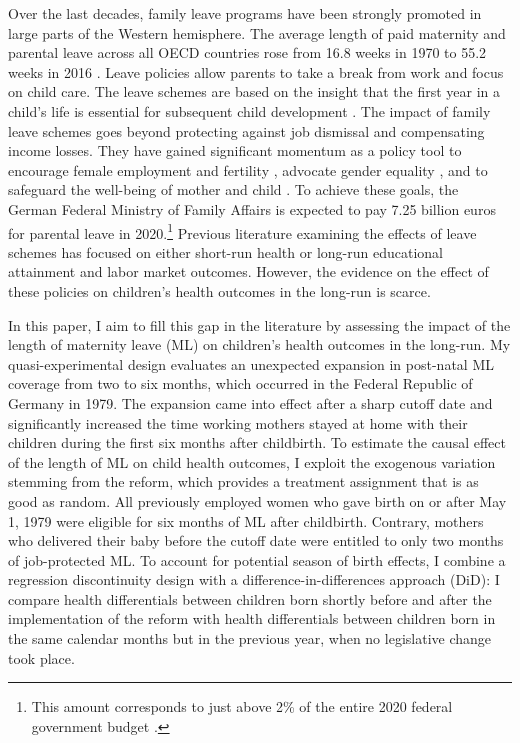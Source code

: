 \documentclass[11pt, a4paper, draft]{article} %
\begin{document}
Over the last decades, family leave programs have been strongly promoted in large parts of the Western hemisphere. The average length of paid maternity and parental leave across all OECD countries rose from 16.8 weeks in 1970 to 55.2 weeks in 2016 \citep{oecd_data_leave}. Leave policies allow parents to take a break from work and focus on child care. The leave schemes are based on the insight that the first year in a child's life is essential for subsequent child development \citep{currie2011human}. The impact of family leave schemes goes beyond protecting against job dismissal and compensating income losses. They have gained significant momentum as a policy tool to encourage female employment \citep{blau2013} and fertility \citep{RafaelLaliveandJosefZweimuller2009}, advocate gender equality \citep{kotsadam2011state}, and to safeguard the well-being of mother and child \citep{butikofer2018impact}. To achieve these goals, the German Federal Ministry of Family Affairs is expected to pay 7.25 billion euros for parental leave in 2020.\footnote{This amount corresponds to just above 2\% of the entire 2020 federal government budget \citep{federal_budget}.} Previous literature examining the effects of leave schemes has focused on either short-run health or long-run educational attainment and labor market outcomes. However, the evidence on the effect of these policies on children's health outcomes in the long-run is scarce.


In this paper, I aim to fill this gap in the literature by assessing the impact of the length of maternity leave (ML) on children’s health outcomes in the long-run. My quasi-experimental design evaluates an unexpected expansion in post-natal ML coverage from two to six months, which occurred in the Federal Republic of Germany in 1979. The expansion came into effect after a sharp cutoff date and significantly increased the time working mothers stayed at home with their children during the first six months after childbirth. To estimate the causal effect of the length of ML on child health outcomes, I exploit the exogenous variation stemming from the reform, which provides a treatment assignment that is as good as random. All previously employed women who gave birth on or after May 1, 1979 were eligible for six months of ML after childbirth. Contrary, mothers who delivered their baby before the cutoff date were entitled to only two months of job-protected ML. To account for potential season of birth effects, I combine a regression discontinuity design with a difference-in-differences approach (DiD): I compare health differentials between children born shortly before and after the implementation of the reform with health differentials between children born in the same calendar months but in the previous year, when no legislative change took place.
\end{document}
